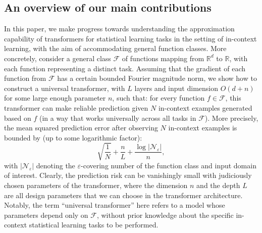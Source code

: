 \documentclass[english]{article}
\begin{document}
%
%







\subsection{An overview of our main contributions} 

In this paper, we make progress towards understanding the approximation capability of transformers for statistical learning tasks in the setting of in-context learning, with the aim of accommodating general function classes. 
More concretely, consider a general class $\mathcal{F}$ 
of functions mapping from $\mathbb{R}^d$ to $\mathbb{R}$, with each function representing a distinct task. Assuming that the gradient of each function from $\mathcal{F}$ has a certain bounded Fourier magnitude norm, 
we show how to construct a universal transformer, with $L$ layers and input dimension $O(d+n)$ for some large enough parameter $n$, such that: for every function $f\in\mathcal{F}$, 
this transformer can make reliable prediction given $N$ in-context examples generated based on $f$ (in a way that works universally across all tasks in $\mathcal{F}$).   More precisely, the mean squared prediction error after observing $N$ in-context examples is bounded by (up to some logarithmic factor):   
%
$$
\sqrt{\frac{1}{N}} + \frac{n}{L} + \frac{\log|\mathcal{N}_\varepsilon|}{n},
$$
%
with $|\mathcal{N}_\varepsilon|$ denoting the $\varepsilon$-covering number of the function class and input domain of interest.  Clearly, the prediction risk can be vanishingly small with judiciously chosen parameters of the transformer, where the dimension $n$ and the depth $L$ are all design parameters that we can choose in the transformer architecture. 
Notably, the term ``universal transformer'' here refers to a model whose parameters depend only on $\mathcal{F}$, without prior knowledge about the specific in-context statistical learning tasks to be performed.
\end{document}
